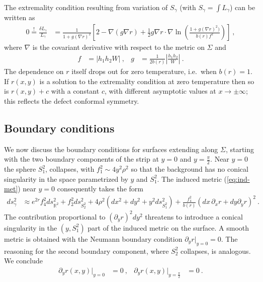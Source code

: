 \documentclass[aps,prd,11pt,notitlepage,longbibliography,nofootinbib,tightenlines,preprintnumbers]{revtex4-1}
\def\RR{{\mathds{R}}}
\begin{document}
The extremality condition resulting from variation of $S_\gamma$ (with $S_\gamma=\int L_\gamma$) can be written as
\begin{align}\label{eq:eom-fg}
	0\stackrel{!}{=}	\frac{\delta L_\gamma}{L_\gamma}&=
	\frac{1}{1+g(\nabla r)^2}\left[2-\nabla(g\nabla r)+\frac{1}{2}g\nabla r\cdot \nabla\ln\left(\frac{1+g(\nabla r)^2)}{b(r) f^2}\right)\right]~,
\end{align}
where $\nabla$ is the covariant derivative with respect to the metric on $\Sigma$ and
\begin{align}
	f&=|h_1 h_2 W|~, & g&=\frac{1}{2b(r)}\left|\frac{h_1 h_2}{W}\right|~.
\end{align}
The dependence on $r$ itself drops out for zero temperature, i.e.\ when $b(r)=1$.
If $r(x,y)$ is a solution to the extremality condition at zero temperature then so is $r(x,y)+c$ with a constant $c$, with different asymptotic values at $x\rightarrow \pm\infty$; this reflects the defect conformal symmetry.


\subsection{Boundary conditions}\label{sec:bc}

We now discuss the boundary conditions for surfaces extending along $\Sigma$, starting with the two boundary components of the strip at $y=0$ and $y=\frac{\pi}{2}$.
Near $y=0$ the sphere $S_1^2$, collapses, with $f_1^2\sim 4y^2 \rho^2$ so that the background has no conical singularity in the space parametrized by $y$ and $S_1^2$.
The induced metric (\ref{eq:ind-met}) near $y=0$ consequently takes the form
\begin{align}
	ds^2_\gamma&\approx e^{2r}f_4^2ds^2_{\RR^2}+f_2^2ds^2_{S^2_2}+4\rho^2 \left( dx^2+dy^2+y^2ds^2_{S_1^2}\right)+\frac{f_4^2}{b(r)}\left(dx\, \partial_x r +dy \partial_y r \right)^2~.
\end{align}
The contribution proportional to $(\partial_y r)^2 dy^2$ threatens to introduce a conical singularity in the $(y,S_1^2)$ part of the induced metric on the surface. A smooth metric is obtained with the Neumann boundary condition $\partial_y r\vert_{y=0}=0$.
The reasoning for the second boundary component, where $S_2^2$ collapses, is analogous. We conclude
\begin{align}\label{eq:Neumann-bc-y}
	\partial_y r(x,y)\big\vert_{y=0}&=0~, & \partial_y r(x,y)\big\vert_{y=\frac{\pi}{2}}&=0~.
\end{align}
\end{document}
